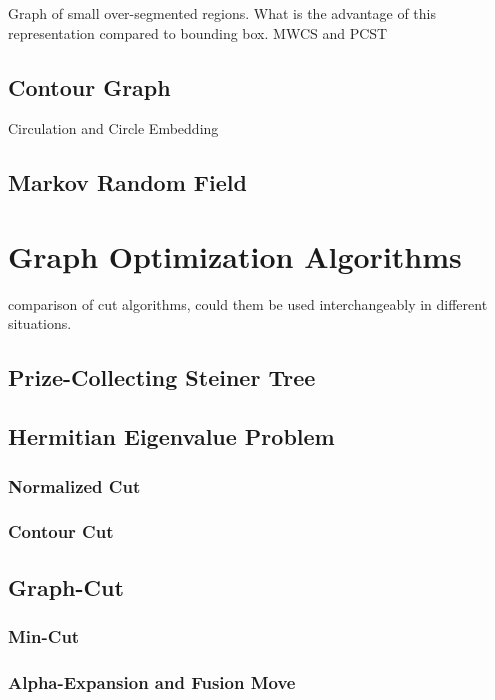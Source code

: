 \documentclass{SMBV12}
\begin{document}
Graph of small over-segmented regions. What is the advantage of this representation compared to bounding box. MWCS and PCST

\subsection{Contour Graph}

Circulation and Circle Embedding

\subsection{Markov Random Field}

\section{Graph Optimization Algorithms}

comparison of cut algorithms, could them be used interchangeably in different situations.

\subsection{Prize-Collecting Steiner Tree}

\subsection{Hermitian Eigenvalue Problem}

\subsubsection{Normalized Cut}

\subsubsection{Contour Cut}

\subsection{Graph-Cut}

\subsubsection{Min-Cut}

\subsubsection{Alpha-Expansion and Fusion Move}
\end{document}
